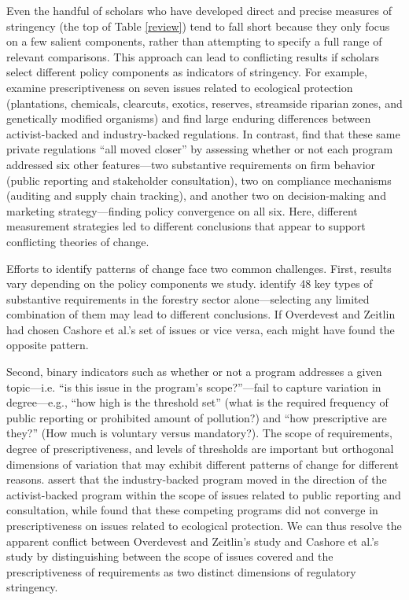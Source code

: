 \documentclass[
      12pt,
            Review ]{article}
\begin{document}
Even the handful of scholars who have developed direct and precise
measures of stringency (the top of Table \ref{review}) tend to fall
short because they only focus on a few salient components, rather than
attempting to specify a full range of relevant comparisons. This
approach can lead to conflicting results if scholars select different
policy components as indicators of stringency. For example,
\citet{Cashore2004} examine prescriptiveness on seven issues related to
ecological protection (plantations, chemicals, clearcuts, exotics,
reserves, streamside riparian zones, and genetically modified organisms)
and find large enduring differences between activist-backed and
industry-backed regulations. In contrast, \citet{Overdevest2014} find
that these same private regulations ``all moved closer'' by assessing
whether or not each program addressed six other features---two
substantive requirements on firm behavior (public reporting and
stakeholder consultation), two on compliance mechanisms (auditing and
supply chain tracking), and another two on decision-making and marketing
strategy---finding policy convergence on all six. Here, different
measurement strategies led to different conclusions that appear to
support conflicting theories of change.

Efforts to identify patterns of change face two common challenges.
First, results vary depending on the policy components we study.
\citet{McDermott2008} identify 48 key types of substantive requirements
in the forestry sector alone---selecting any limited combination of them
may lead to different conclusions. If Overdevest and Zeitlin had chosen
Cashore et al.'s set of issues or vice versa, each might have found the
opposite pattern.

Second, binary indicators such as whether or not a program addresses a
given topic---i.e. ``is this issue in the program's scope?''---fail to
capture variation in degree---e.g., ``how high is the threshold set''
(what is the required frequency of public reporting or prohibited amount
of pollution?) and ``how prescriptive are they?'' (How much is voluntary
versus mandatory?). The scope of requirements, degree of
prescriptiveness, and levels of thresholds are important but orthogonal
dimensions of variation that may exhibit different patterns of change
for different reasons. \citet{Overdevest2014} assert that the
industry-backed program moved in the direction of the activist-backed
program within the scope of issues related to public reporting and
consultation, while \citet{Cashore2004} found that these competing
programs did not converge in prescriptiveness on issues related to
ecological protection. We can thus resolve the apparent conflict between
Overdevest and Zeitlin's study and Cashore et al.'s study by
distinguishing between the scope of issues covered and the
prescriptiveness of requirements as two distinct dimensions of
regulatory stringency.
\end{document}
